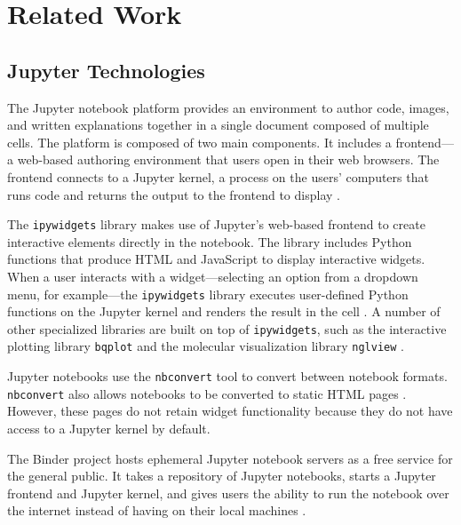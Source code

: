 \documentclass[nobib]{tufte-handout}
\newcommand{\code}[1]{\texttt{#1}}
\begin{document}

\section{Related Work} %
\label{sec:related_work}

\subsection{Jupyter Technologies} %
\label{sub:jupyter_technologies}

The Jupyter notebook platform provides an environment to author code, images,
and written explanations together in a single document composed of multiple
cells. The platform is composed of two main components. It includes a
frontend---a web-based authoring environment that users open in their web
browsers. The frontend connects to a Jupyter kernel, a process on the users'
computers that runs code and returns the output to the frontend to display
\cite{thomas_jupyter_2016}.

The \code{ipywidgets} library makes use of Jupyter's web-based frontend to
create interactive elements directly in the notebook. The library includes
Python functions that produce HTML and JavaScript to display interactive
widgets. When a user interacts with a widget---selecting an option from a
dropdown menu, for example---the \code{ipywidgets} library executes
user-defined Python functions on the Jupyter kernel and renders the result in
the cell \cite{_jupyter-widgets/ipywidgets_}. A number of other specialized
libraries are built on top of \code{ipywidgets}, such as the interactive
plotting library \code{bqplot} \cite{_bqplot_2018} and the molecular
visualization library \code{nglview} \cite{_arose/nglview_}.

Jupyter notebooks use the \code{nbconvert} tool to convert between notebook
formats. \code{nbconvert} also allows notebooks to be converted to static HTML
pages \cite{_jupyter/nbconvert_}. However, these pages do not retain widget
functionality because they do not have access to a Jupyter kernel by default.

The Binder project hosts ephemeral Jupyter notebook servers as a free service
for the general public. It takes a repository of Jupyter notebooks, starts a
Jupyter frontend and Jupyter kernel, and gives users the ability to run the
notebook over the internet instead of having on their local machines
\cite{_binder_}.
\end{document}
